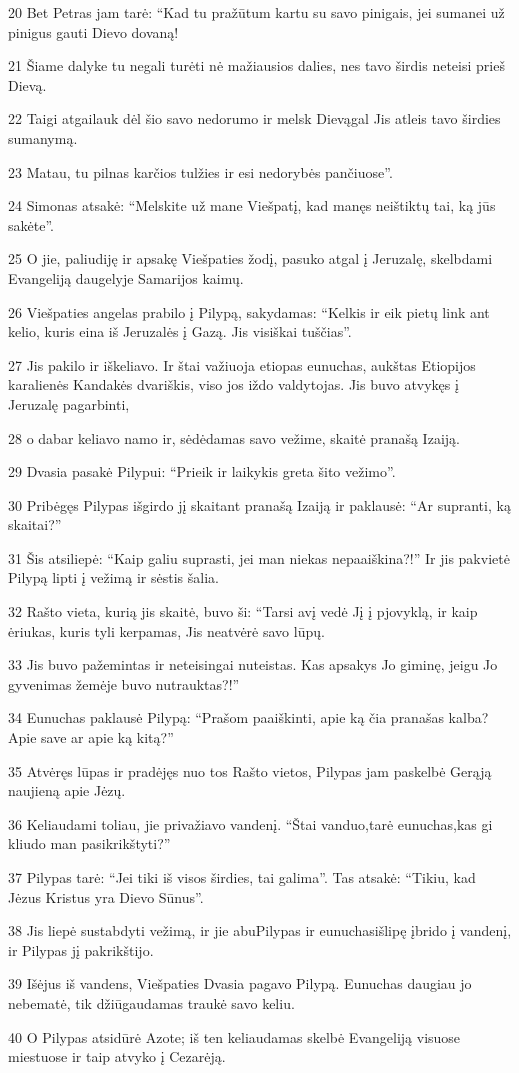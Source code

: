 \par 20 Bet Petras jam tarė: “Kad tu pražūtum kartu su savo pinigais, jei sumanei už pinigus gauti Dievo dovaną! 
\par 21 Šiame dalyke tu negali turėti nė mažiausios dalies, nes tavo širdis neteisi prieš Dievą. 
\par 22 Taigi atgailauk dėl šio savo nedorumo ir melsk Dievą­gal Jis atleis tavo širdies sumanymą. 
\par 23 Matau, tu pilnas karčios tulžies ir esi nedorybės pančiuose”. 
\par 24 Simonas atsakė: “Melskite už mane Viešpatį, kad manęs neištiktų tai, ką jūs sakėte”. 
\par 25 O jie, paliudiję ir apsakę Viešpaties žodį, pasuko atgal į Jeruzalę, skelbdami Evangeliją daugelyje Samarijos kaimų. 
\par 26 Viešpaties angelas prabilo į Pilypą, sakydamas: “Kelkis ir eik pietų link ant kelio, kuris eina iš Jeruzalės į Gazą. Jis visiškai tuščias”. 
\par 27 Jis pakilo ir iškeliavo. Ir štai važiuoja etiopas eunuchas, aukštas Etiopijos karalienės Kandakės dvariškis, viso jos iždo valdytojas. Jis buvo atvykęs į Jeruzalę pagarbinti, 
\par 28 o dabar keliavo namo ir, sėdėdamas savo vežime, skaitė pranašą Izaiją. 
\par 29 Dvasia pasakė Pilypui: “Prieik ir laikykis greta šito vežimo”. 
\par 30 Pribėgęs Pilypas išgirdo jį skaitant pranašą Izaiją ir paklausė: “Ar supranti, ką skaitai?” 
\par 31 Šis atsiliepė: “Kaip galiu suprasti, jei man niekas nepaaiškina?!” Ir jis pakvietė Pilypą lipti į vežimą ir sėstis šalia. 
\par 32 Rašto vieta, kurią jis skaitė, buvo ši: “Tarsi avį vedė Jį į pjovyklą, ir kaip ėriukas, kuris tyli kerpamas, Jis neatvėrė savo lūpų. 
\par 33 Jis buvo pažemintas ir neteisingai nuteistas. Kas apsakys Jo giminę, jeigu Jo gyvenimas žemėje buvo nutrauktas?!” 
\par 34 Eunuchas paklausė Pilypą: “Prašom paaiškinti, apie ką čia pranašas kalba? Apie save ar apie ką kitą?” 
\par 35 Atvėręs lūpas ir pradėjęs nuo tos Rašto vietos, Pilypas jam paskelbė Gerąją naujieną apie Jėzų. 
\par 36 Keliaudami toliau, jie privažiavo vandenį. “Štai vanduo,­tarė eunuchas,­kas gi kliudo man pasikrikštyti?” 
\par 37 Pilypas tarė: “Jei tiki iš visos širdies, tai galima”. Tas atsakė: “Tikiu, kad Jėzus Kristus yra Dievo Sūnus”. 
\par 38 Jis liepė sustabdyti vežimą, ir jie abu­Pilypas ir eunuchas­išlipę įbrido į vandenį, ir Pilypas jį pakrikštijo. 
\par 39 Išėjus iš vandens, Viešpaties Dvasia pagavo Pilypą. Eunuchas daugiau jo nebematė, tik džiūgaudamas traukė savo keliu. 
\par 40 O Pilypas atsidūrė Azote; iš ten keliaudamas skelbė Evangeliją visuose miestuose ir taip atvyko į Cezarėją.



